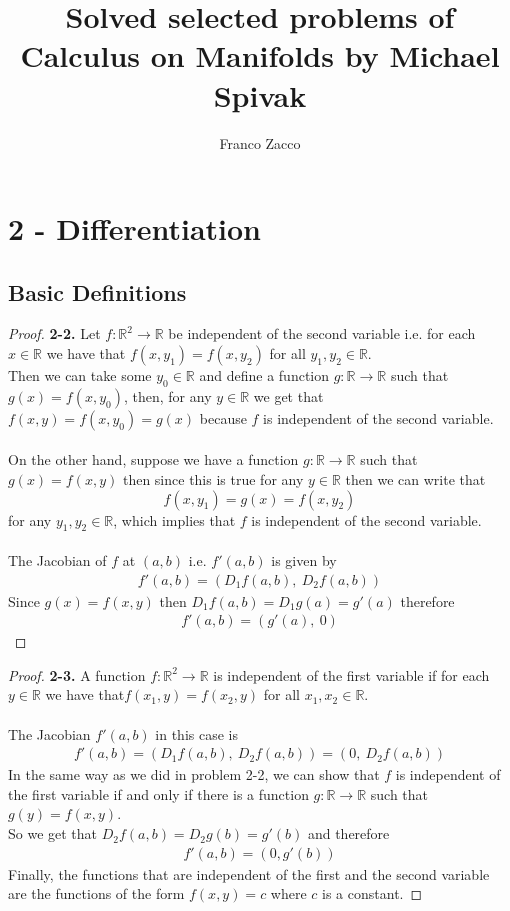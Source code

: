 \documentclass[11pt]{article}
\title{\textbf{Solved selected problems of Calculus on Manifolds by Michael Spivak}}
\author{Franco Zacco}
\date{}
\newcommand{\R}{\mathbb{R}}
\theoremstyle{definition}
\begin{document}
\maketitle
\thispagestyle{empty}

\section*{2 - Differentiation}
\subsection*{Basic Definitions}
\begin{proof}{\textbf{2-2.}}
Let $f:\R^2 \to \R$ be independent of the second variable i.e. for each
$x \in \R$ we have that $f(x,y_1) = f(x, y_2)$ for all $y_1, y_2 \in \R$.
\\
Then we can take some $y_0 \in \R$ and define a function $g:\R \to \R$ such
that $g(x) = f(x,y_0)$, then, for any $y\in \R$ we get that
$f(x,y) = f(x,y_0) = g(x)$ because $f$ is independent of the second variable.
\\\\
On the other hand, suppose we have a function $g:\R \to \R$ such that
$g(x) = f(x,y)$ then since this is true for any $y\in \R$ then we can write 
that
$$f(x,y_1) = g(x) = f(x, y_2)$$
for any $y_1, y_2 \in \R$, which implies that $f$ is independent of the second
variable.
\\\\
The Jacobian of $f$ at $(a,b)$ i.e. $f'(a,b)$ is given by
\begin{align*}
    f'(a,b) = (D_1f(a, b),~D_2f(a, b))
\end{align*}
Since $g(x) = f(x,y)$ then $D_1f(a,b) = D_1g(a) = g'(a)$ therefore
\begin{align*}
    f'(a,b) = (g'(a),~0)
\end{align*}
\end{proof}

\cleardoublepage
\begin{proof}{\textbf{2-3.}}
A function $f:\R^2 \to \R$ is independent of the first variable if for each
$y\in \R$ we have that$f(x_1, y) = f(x_2, y)$ for all $x_1, x_2 \in \R$.
\\\\
The Jacobian $f'(a,b)$ in this case is
\begin{align*}
    f'(a,b) = (D_1f(a,b),~D_2f(a,b)) = (0,~D_2f(a,b))
\end{align*}
In the same way as we did in problem 2-2, we can show that $f$ is independent
of the first variable if and only if there is a function $g:\R \to \R$
such that $g(y) = f(x,y)$.
\\
So we get that $D_2f(a,b) = D_2g(b) = g'(b)$ and therefore
\begin{align*}
    f'(a,b) = (0, g'(b))
\end{align*}
Finally, the functions that are independent of the first and the second variable
are the functions of the form $f(x, y) = c$ where $c$ is a constant.
\end{proof}
\end{document}
